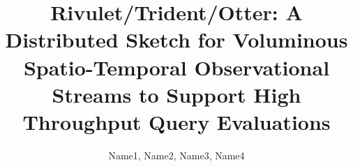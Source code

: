 \documentclass{vldb}
\begin{document}
\title{Rivulet/Trident/Otter: A Distributed Sketch for Voluminous Spatio-Temporal Observational Streams to Support High Throughput Query Evaluations}

\author{
\alignauthor
Name1, Name2, Name3, Name4\\
       \\
       \\
       \\
}


\maketitle













\end{document}
